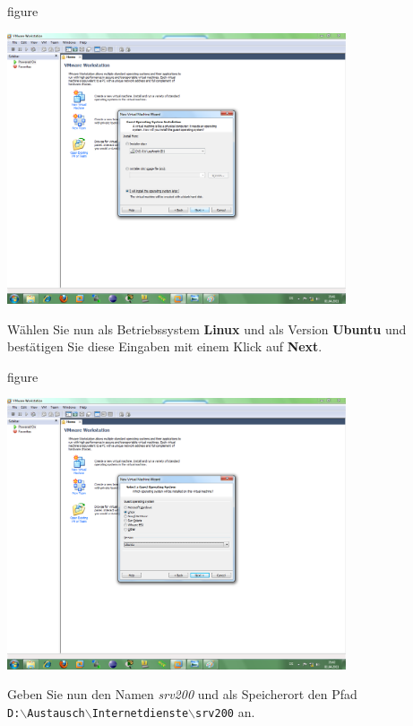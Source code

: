 \begin{nofloat}{figure}
\begin{center}
\includegraphics[width=0.75\textwidth]{screenshots/vm03.png}
\end{center}
\end{nofloat}

Wählen Sie nun als Betriebssystem \textbf{Linux} und als Version \textbf{Ubuntu} und bestätigen Sie diese
Eingaben mit einem Klick auf \textbf{Next}.

\begin{nofloat}{figure}
\begin{center}
\includegraphics[width=0.75\textwidth]{screenshots/vm04.png}
\end{center}
\end{nofloat}

Geben Sie nun den Namen \textit{srv200} und als Speicherort den Pfad \\
\texttt{D:$\backslash$Austausch$\backslash$Internetdienste$\backslash$srv200}
an.

